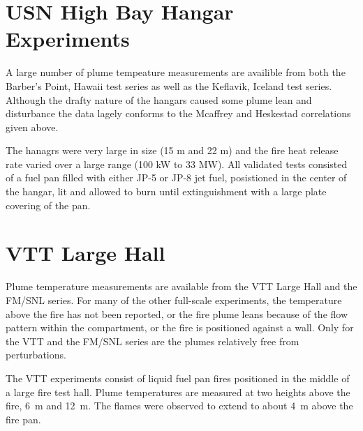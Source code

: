 %


\section{USN High Bay Hangar Experiments}

\label{USN_Plume}

A large number of plume tempeature measurements are availible from both the Barber's Point, Hawaii test series as well as the Keflavik, Iceland test series. Although the drafty nature of the hangars caused some plume lean and disturbance the data lagely conforms to the Mcaffrey and Heskestad correlations given above.

The hanagrs were very large in size (15 m and 22 m) and the fire heat release rate varied over a large range (100 kW to 33 MW). All validated tests consisted of a fuel pan filled with either JP-5 or JP-8 jet fuel, posistioned in the center of the hangar, lit and allowed to burn until extinguishment with a large plate covering of the pan.


\section{VTT Large Hall}

\label{VTT_plume}

Plume temperature measurements are available from the VTT Large Hall and the FM/SNL series.
For many of the other full-scale experiments, the temperature above the fire has not been reported, or the fire plume
leans because of the flow pattern within the compartment, or the fire is positioned against a wall.
Only for the VTT and the FM/SNL series are the plumes relatively free from perturbations.

The VTT experiments consist of liquid fuel pan fires positioned in the middle of a large fire test hall.
Plume temperatures are measured at two heights above the fire, 6~m and 12~m.
The flames were observed to extend to about 4~m above the fire pan.


